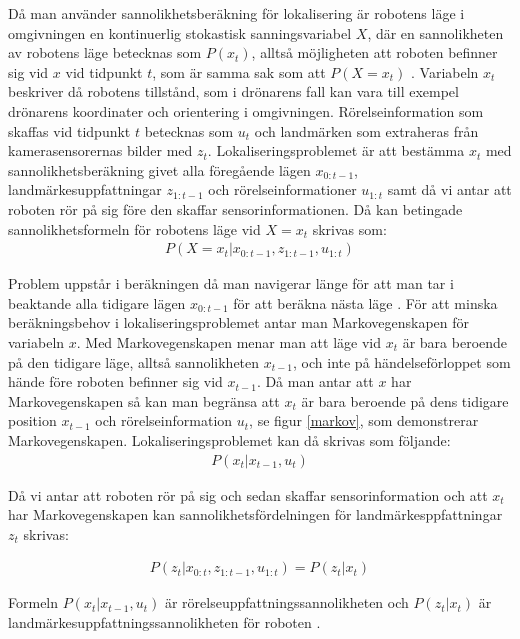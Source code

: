 Då man använder sannolikhetsberäkning för lokalisering är robotens läge i omgivningen en kontinuerlig stokastisk sanningsvariabel $X$, där en sannolikheten av robotens läge betecknas som $P(x_t)$, alltså möjligheten att roboten befinner sig vid $x$ vid tidpunkt $t$, som är samma sak som att $P(X = x_t)$ \citep{ProbabilisticRobotics}. Variabeln $x_t$ beskriver då robotens tillstånd, som i drönarens fall kan vara till exempel drönarens koordinater och orientering i omgivningen. Rörelseinformation som skaffas vid tidpunkt $t$ betecknas som $u_t$ och landmärken som extraheras från kamerasensorernas bilder med $z_t$. Lokaliseringsproblemet är att bestämma $x_t$ med sannolikhetsberäkning givet alla föregående lägen $x_{0:t-1}$, landmärkesuppfattningar $z_{1:t-1}$ och rörelseinformationer $u_{1:t}$ samt då vi antar att roboten rör på sig före den skaffar sensorinformationen. Då kan betingade sannolikhetsformeln för robotens läge vid $X = x_t$ skrivas som:
\begin{align}
    P( X = x_t | x_{0:t-1}, z_{1:t-1}, u_{1:t})
\end{align}

Problem uppstår i beräkningen då man navigerar länge för att man tar i beaktande alla tidigare lägen $x_{0:t-1}$ för att beräkna nästa läge \citep{ProbabilisticRobotics}. För att minska beräkningsbehov i lokaliseringsproblemet antar man Markovegenskapen för variabeln $x$. Med Markovegenskapen menar man att läge vid $x_t$ är bara beroende på den tidigare läge, alltså sannolikheten $x_{t-1}$, och inte på händelseförloppet som hände före roboten befinner sig vid $x_{t-1}$. Då man antar att $x$ har Markovegenskapen så kan man begränsa att $x_t$ är bara beroende på dens tidigare position $x_{t-1}$ och rörelseinformation $u_t$, se figur \ref{markov}, som demonstrerar Markovegenskapen. Lokaliseringsproblemet kan då skrivas som följande:
\begin{align}
    P(x_t | x_{t-1}, u_{t})
\end{align}

Då vi antar att roboten rör på sig och sedan skaffar sensorinformation och att $x_t$ har Markovegenskapen kan sannolikhetsfördelningen för landmärkesppfattningar $z_t$ skrivas:

\begin{align}
    P(z_t | x_{0:t}, z_{1:t-1}, u_{1:t}) = P(z_t|x_t)
\end{align}

Formeln $P(x_t|x_{t-1}, u_{t})$ är rörelseuppfattningssannolikheten och $P(z_t|x_t)$ är landmärkesuppfattningssannolikheten för roboten \citep{ProbabilisticRobotics}. 

